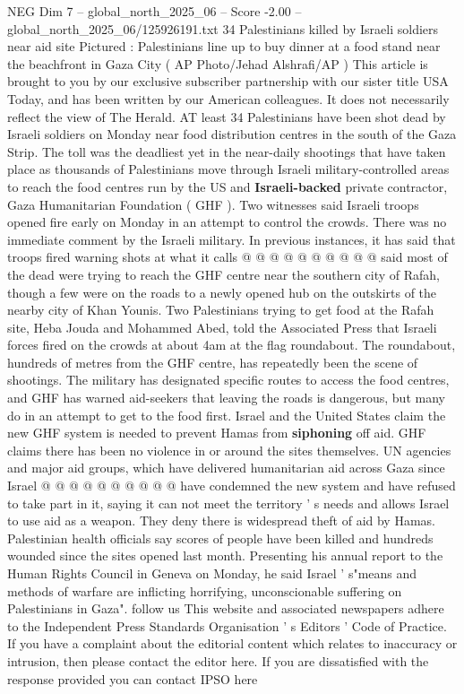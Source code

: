 \begin{textsample}{NEG Dim 7 – global\_north\_2025\_06 – Score -2.00 – global\_north\_2025\_06/125926191.txt}  \label{ex:f7_neg_077}
34 Palestinians killed by Israeli soldiers near aid site Pictured : Palestinians line up to buy dinner at a food stand near the beachfront in Gaza City ( AP Photo/Jehad Alshrafi/AP ) This article is brought to you by our exclusive subscriber partnership with our sister title USA Today, and has been written by our American colleagues.
It does not necessarily reflect the view of The Herald.
AT least 34 Palestinians have been shot dead by Israeli soldiers on Monday near food distribution centres in the south of the Gaza Strip.
The toll was the deadliest yet in the near-daily shootings that have taken place as thousands of Palestinians move through Israeli military-controlled areas to reach the food centres run by the US and \textbf{Israeli-backed} private contractor, Gaza Humanitarian Foundation ( GHF ).
Two witnesses said Israeli troops opened fire early on Monday in an attempt to control the crowds.
There was no immediate comment by the Israeli military.
In previous instances, it has said that troops fired warning shots at what it calls @ @ @ @ @ @ @ @ @ @ said most of the dead were trying to reach the GHF centre near the southern city of Rafah, though a few were on the roads to a newly opened hub on the outskirts of the nearby city of Khan Younis.
Two Palestinians trying to get food at the Rafah site, Heba Jouda and Mohammed Abed, told the Associated Press that Israeli forces fired on the crowds at about 4am at the flag roundabout.
The roundabout, hundreds of metres from the GHF centre, has repeatedly been the scene of shootings.
The military has designated specific routes to access the food centres, and GHF has warned aid-seekers that leaving the roads is dangerous, but many do in an attempt to get to the food first.
Israel and the United States claim the new GHF system is needed to prevent Hamas from \textbf{siphoning} off aid.
GHF claims there has been no violence in or around the sites themselves.
UN agencies and major aid groups, which have delivered humanitarian aid across Gaza since Israel @ @ @ @ @ @ @ @ @ @ have condemned the new system and have refused to take part in it, saying it can not meet the territory ' s needs and allows Israel to use aid as a weapon.
They deny there is widespread theft of aid by Hamas.
Palestinian health officials say scores of people have been killed and hundreds wounded since the sites opened last month.
Presenting his annual report to the Human Rights Council in Geneva on Monday, he said Israel ' s"means and methods of warfare are inflicting horrifying, unconscionable suffering on Palestinians in Gaza". follow us This website and associated newspapers adhere to the Independent Press Standards Organisation ' s Editors ' Code of Practice.
If you have a complaint about the editorial content which relates to inaccuracy or intrusion, then please contact the editor here.
If you are dissatisfied with the response provided you can contact IPSO here

\end{textsample}
